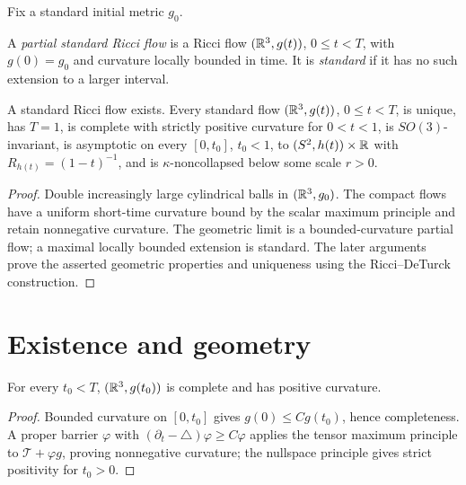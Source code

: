 Fix a standard initial metric $g_0$.

\begin{definition}
\label{def:standard-ricci-flow}

A \emph{partial standard Ricci flow} is a Ricci flow $(\mathbb{R}^3,g(t))$,
$0\le t<T$, with $g(0)=g_0$ and curvature locally bounded in time. It is
\emph{standard} if it has no such extension to a larger interval.
\end{definition}

\begin{theorem}
\label{thm:standard-solution-existence-uniqueness}
\label{stdsoln}

A standard Ricci flow exists. Every standard flow $(\mathbb{R}^3,g(t))$, $0\le t<T$,
is unique, has $T=1$, is complete with strictly positive curvature for
$0<t<1$, is $SO(3)$-invariant, is asymptotic on every $[0,t_0]$, $t_0<1$,
to $(S^2,h(t))\times\mathbb{R}$ with $R_{h(t)}=(1-t)^{-1}$, and is
$\kappa$-noncollapsed below some scale $r>0$.
\end{theorem}
\begin{proof}
\sketch Double increasingly large cylindrical balls in $(\mathbb{R}^3,g_0)$.
The compact flows have a uniform short-time curvature bound by the scalar
maximum principle and retain nonnegative curvature. The geometric limit is
a bounded-curvature partial flow; a maximal locally bounded extension is
standard. The later arguments prove the asserted geometric properties and
uniqueness using the Ricci--DeTurck construction.
\end{proof}

\section{Existence and geometry}

\begin{lemma}
\label{lem:standard-flow-complete-positive-curvature}
\label{third}

For every $t_0<T$, $(\mathbb{R}^3,g(t_0))$ is complete and has positive curvature.
\end{lemma}
\begin{proof}
\sketch Bounded curvature on $[0,t_0]$ gives $g(0)\le Cg(t_0)$, hence
completeness. A proper barrier $\varphi$ with
$(\partial_t-\triangle)\varphi\ge C\varphi$ applies the tensor maximum
principle to $\mathcal T+\varphi g$, proving nonnegative curvature;
the nullspace principle gives strict positivity for $t_0>0$.
\end{proof}

